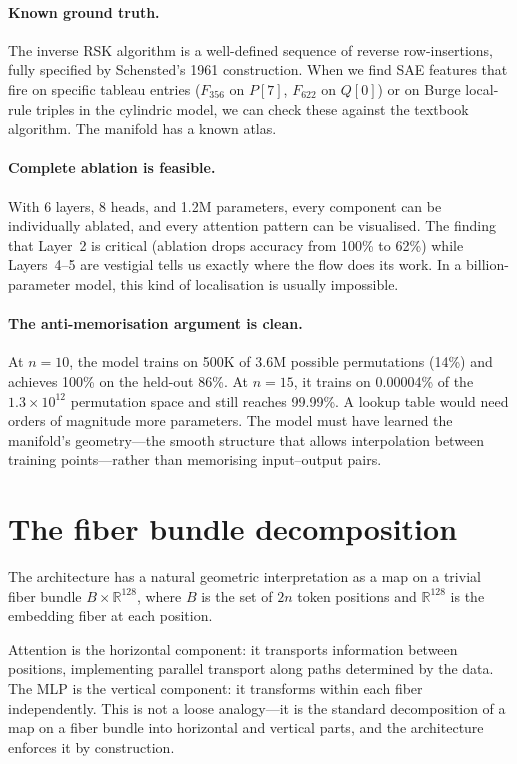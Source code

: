 \documentclass[11pt]{article}
\begin{document}
\paragraph{Known ground truth.}
The inverse RSK algorithm is a well-defined sequence of reverse
row-insertions, fully specified by Schensted's 1961 construction. When
we find SAE features that fire on specific tableau entries ($F_{356}$
on $P[7]$, $F_{622}$ on $Q[0]$) or on Burge local-rule triples in the
cylindric model, we can check these against the textbook algorithm.
The manifold has a known atlas.

\paragraph{Complete ablation is feasible.}
With 6 layers, 8 heads, and 1.2M parameters, every component can be
individually ablated, and every attention pattern can be visualised.
The finding that Layer~2 is critical (ablation drops accuracy from
100\% to 62\%) while Layers~4--5 are vestigial tells us exactly where
the flow does its work. In a billion-parameter model, this kind of
localisation is usually impossible.

\paragraph{The anti-memorisation argument is clean.}
At $n = 10$, the model trains on 500K of 3.6M possible permutations
(14\%) and achieves 100\% on the held-out 86\%. At $n = 15$, it trains
on 0.00004\% of the $1.3 \times 10^{12}$ permutation space and still
reaches 99.99\%. A lookup table would need orders of magnitude more
parameters. The model must have learned the manifold's
geometry---the smooth structure that allows interpolation between
training points---rather than memorising input--output pairs.

\section*{The fiber bundle decomposition}

The architecture has a natural geometric interpretation as a map on a
trivial fiber bundle $B \times \mathbb{R}^{128}$, where $B$ is the
set of $2n$ token positions and $\mathbb{R}^{128}$ is the embedding
fiber at each position.

Attention is the horizontal component: it transports information
between positions, implementing parallel transport along paths
determined by the data. The MLP is the vertical component: it
transforms within each fiber independently. This is not a loose
analogy---it is the standard decomposition of a map on a fiber bundle
into horizontal and vertical parts, and the architecture enforces it
by construction.
\end{document}
